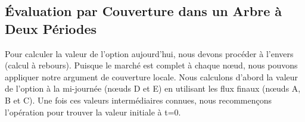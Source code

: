 \subsection{Évaluation par Couverture dans un Arbre à Deux Périodes}

\begin{intuitionbox}
Pour calculer la valeur de l'option aujourd'hui, nous devons procéder à l'envers (calcul à rebours). Puisque le marché est complet à chaque nœud, nous pouvons appliquer notre argument de couverture locale. Nous calculons d'abord la valeur de l'option à la mi-journée (nœuds D et E) en utilisant les flux finaux (nœuds A, B et C). Une fois ces valeurs intermédiaires connues, nous recommençons l'opération pour trouver la valeur initiale à t=0.
\end{intuitionbox}

\newpage

